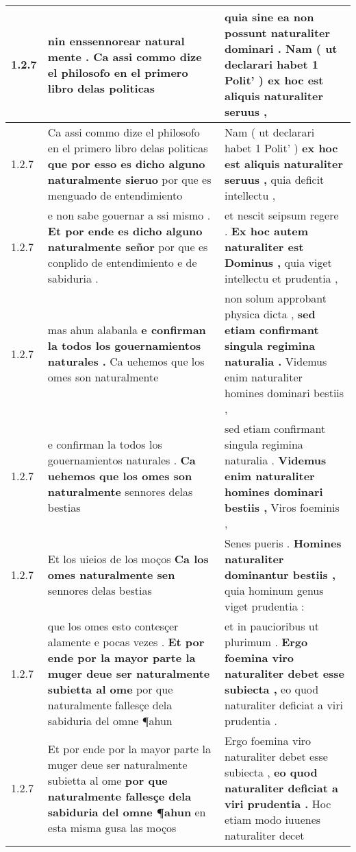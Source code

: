 \begin{tabular}{|p{1cm}|p{6.5cm}|p{6.5cm}|}
1.2.7 & nin \textbf{ enssennorear natural mente . } Ca assi commo dize el philosofo en el primero libro delas politicas & quia sine ea non possunt naturaliter dominari . \textbf{ Nam ( ut declarari habet 1 Polit’ ) } ex hoc est aliquis naturaliter seruus , \\\hline
1.2.7 & Ca assi commo dize el philosofo en el primero libro delas politicas \textbf{ que por esso es dicho alguno naturalmente sieruo } por que es menguado de entendimiento & Nam ( ut declarari habet 1 Polit’ ) \textbf{ ex hoc est aliquis naturaliter seruus , } quia deficit intellectu , \\\hline
1.2.7 & e non sabe gouernar a ssi mismo . \textbf{ Et por ende es dicho alguno naturalmente señor } por que es conplido de entendimiento e de sabiduria . & et nescit seipsum regere . \textbf{ Ex hoc autem naturaliter est Dominus , } quia viget intellectu et prudentia , \\\hline
1.2.7 & mas ahun alabanla \textbf{ e confirman la todos los gouernamientos naturales . } Ca uehemos que los omes son naturalmente & non solum approbant physica dicta , \textbf{ sed etiam confirmant singula regimina naturalia . } Videmus enim naturaliter homines dominari bestiis , \\\hline
1.2.7 & e confirman la todos los gouernamientos naturales . \textbf{ Ca uehemos que los omes son naturalmente } sennores delas bestias & sed etiam confirmant singula regimina naturalia . \textbf{ Videmus enim naturaliter homines dominari bestiis , } Viros foeminis , \\\hline
1.2.7 & Et los uieios de los moços \textbf{ Ca los omes naturalmente sen } sennores delas bestias & Senes pueris . \textbf{ Homines naturaliter dominantur bestiis , } quia hominum genus viget prudentia : \\\hline
1.2.7 & que los omes esto contesçer alamente e pocas vezes . \textbf{ Et por ende por la mayor parte la muger deue ser naturalmente subietta al ome } por que naturalmente fallesçe dela sabiduria del omne ¶ahun & et in paucioribus ut plurimum . \textbf{ Ergo foemina viro naturaliter debet esse subiecta , } eo quod naturaliter deficiat a viri prudentia . \\\hline
1.2.7 & Et por ende por la mayor parte la muger deue ser naturalmente subietta al ome \textbf{ por que naturalmente fallesçe dela sabiduria del omne ¶ahun } en esta misma gusa las moços & Ergo foemina viro naturaliter debet esse subiecta , \textbf{ eo quod naturaliter deficiat a viri prudentia . } Hoc etiam modo iuuenes naturaliter decet \\\hline

\end{tabular}
